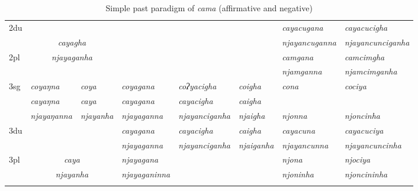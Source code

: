\begin{landscape}
\begin{table}[p]
{\begin{tabular}{l|p{2.4cm}|p{1.5cm}|p{2.4cm}|p{2.4cm}|p{2.4cm}|p{3.2cm}|p{3.2cm}}
{\sc 2du}		& \multicolumn{2}{c|}{}     & \multicolumn{3}{c|}{\cellcolor[gray]{.8}} & \it  cayacugana  & \it   cayacucigha \\
		& \multicolumn{2}{c|}{\it cayagha} & \multicolumn{3}{c|}{ \cellcolor[gray]{.8}}& \it njayancuganna  & \it  njayancunciganha \\
 \cline{1-1} \cline{7-8}			
{\sc 2pl}	& \multicolumn{2}{c|}{\it njayaganha} & \multicolumn{3}{c|}{\cellcolor[gray]{.8} }& \it  camgana& \it  camcimgha  \\
		& 	\multicolumn{2}{c|}{ }& \multicolumn{3}{c|}{\cellcolor[gray]{.8} }& \it  njamganna & \it  njamcimganha \\
\hline			
{\sc 3sg}	& \it coyaŋna	\ti  & \it 	 coya   \ti  	& \it   	coyagana		\ti & \it   coʔyacigha \ti  & \it   coigha \ti 	& \it cona & \it cociya \\
					& \it cayaŋna	  & \it 	      caya	& \it  cayagana 			& \it  cayacigha   & \it   caigha	& \it  & \it  \\
					& \it  njayaŋanna   & \it   njayanha 	& \it  njayaganna& \it  njayanciganha & \it  njaigha  & \it njonna& \it njoncinha\\
\hline
{\sc 3du }		&  \multicolumn{2}{c|}{}& \it cayagana& \it cayacigha & \it    caigha& \it   cayacuna & \it   cayacuciya\\
		& \multicolumn{2}{c|}{}& \it   	njayaganna	& \it njayanciganha	& \it  njaiganha& \it  njayancunna & \it njayancuncinha \\
 \cline{1-1} \cline{4-4} \cline{7-8}	
{\sc 3pl}		& \multicolumn{2}{c|}{\it caya}& \it njayagana& \it & \it  & \it njona& \it njociya\\	
	& \multicolumn{2}{c|}{\it  njayanha}			& \it njayaganinna& \it  & \it  & \it njoninha& \it njoncininha \\
\lspbottomrule
\end{tabular}
}

\caption{Simple past  paradigm of \emph{cama}  (affirmative and negative)}\label{par-cama-pst}
\end{table}



\end{landscape}
